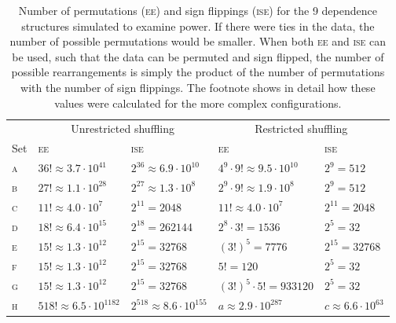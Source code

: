 \begin{table}[!tp]
\caption[Number of permutations and sign flippings for the dependence structures used to examine power.]{Number of permutations (\textsc{ee}) and sign flippings (\textsc{ise}) for the 9 dependence structures simulated to examine power. If there were ties in the data, the number of possible permutations would be smaller. When both \textsc{ee} and \textsc{ise} can be used, such that the data can be permuted and sign flipped, the number of possible rearrangements is simply the product of the number of permutations with the number of sign flippings. The footnote shows in detail how these values were calculated for the more complex configurations.}
\begin{center}
{\small
\begin{tabular}{@{}m{10mm}<{\raggedright}
                   m{29mm}<{\raggedright}
                   m{28mm}<{\raggedright}
                   m{29mm}<{\raggedright}
                   m{23mm}<{\raggedright}@{}}
\toprule
{}        & \multicolumn{2}{c}{Unrestricted shuffling} & \multicolumn{2}{c}{Restricted shuffling}\\
\cmidrule(lr){2-3} \cmidrule(l){4-5}
Set & \textsc{ee} & \textsc{ise} & \textsc{ee} & \textsc{ise}\\
\midrule
\textsc{a} & $36! \approx 3.7 \cdot 10^{41}$ & $2^{36} \approx 6.9 \cdot 10^{10}$ & $4^9 \cdot 9! \approx 9.5 \cdot 10^{10} $ & $2^9=512$\\
\textsc{b} & $27! \approx 1.1 \cdot 10^{28}$ & $2^{27} \approx 1.3 \cdot 10^{8}$ & $2^9 \cdot 9! \approx 1.9 \cdot 10^{8} $ & $2^9=512$\\
\textsc{c} & $11! \approx 4.0 \cdot 10^{7}$ & $2^{11} = 2048$ & $11! \approx 4.0 \cdot 10^{7}$ & $2^{11} = 2048$\\
\textsc{d} & $18! \approx 6.4 \cdot 10^{15}$ & $2^{18} = 262144$ & $2^8 \cdot 3! = 1536$ & $2^5 = 32$\\
\textsc{e} & $15! \approx 1.3 \cdot 10^{12}$ & $2^{15} = 32768$ & $(3!)^5 = 7776$ & $2^{15} = 32768$\\
\textsc{f} & $15! \approx 1.3 \cdot 10^{12}$ & $2^{15} = 32768$ & $5! = 120$ & $2^5 = 32$\\
\textsc{g} & $15! \approx 1.3 \cdot 10^{12}$ & $2^{15} = 32768$ & $(3!)^5 \cdot 5! = 933120$ & $2^5 = 32$\\
\textsc{h} & $518! \approx 6.5 \cdot 10^{1182}$ & $2^{518} \approx 8.6 \cdot 10^{155}$ & $a \approx 2.9 \cdot 10^{287}$ & $c \approx 6.6 \cdot 10^{63}$\\

\end{tabular}}
\end{center}
\end{table}
